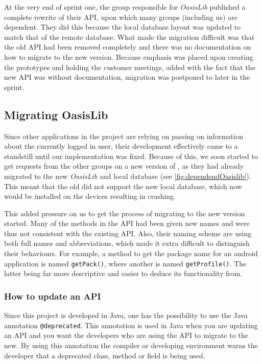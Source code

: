 At the very end of sprint one, the group responsible for \textit{OasisLib} published a complete rewrite of their API,  upon which many groups (including us) are dependent.
They did this because the local database layout was updated to match that of the remote database.
What made the migration difficult was that the old API had been removed completely and there was no documentation on how to migrate to the new version.
Because emphasis was placed upon creating the prototypes and holding the customer meetings, added with the fact that the new API was without documentation, migration was postponed to later in the sprint.

\subsection{Migrating OasisLib}\label{sec:oasismigration}

Since other applications in the \giraf project are relying on \launcher passing on information about the currently logged in user, their development effectively came to a standstill until our implementation was fixed.
Because of this, we soon started to get requests from the other groups on a new version of \launcher, as they had already migrated to the new \textit{OasisLib} and local database (see \cref{fig:dependendOasislib}).
This meant that the old \launcher did not support the new local database, which now would be installed on the devices resulting in \launcher crashing.


This added pressure on us to get the process of migrating to the new version started.
Many of the methods in the API had been given new names and were thus not consistent with the existing API.
Also, their naming scheme are using both full names and abbreviations, which made it extra difficult to distinguish their behaviours.
For example, a method to get the package name for an android application is named \lstinline{getPack()}, where another is named \lstinline{getProfile()}.
The latter being far more descriptive and easier to deduce its functionality from.

\subsubsection{How to update an API}
Since this project is developed in Java, one has the possibility to use the Java annotation \lstinline{@deprecated}.
This annotation is used in Java when you are updating an API and you want the developers who are using the API to migrate to the new.
By using this annotation the compiler or developing environment warns the developer that a deprecated class, method or field is being used.

